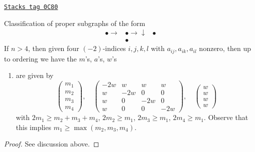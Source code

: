 \begin{lemma}[D4]
\label{models-lemma-D4}
\href{https://stacks.math.columbia.edu/tag/0C80}{\texttt{Stacks tag 0C80}}

Classification of proper subgraphs of the form
$$
\begin{array}{ccc}\bullet \longrightarrow & \bullet \longrightarrow\downarrow & \bullet \\  & \bullet & \end{array}
$$
If $n > 4$, then given four $(-2)$-indices $i, j, k, l$
with $a_{ij}, a_{ik}, a_{il}$ nonzero, then up
to ordering we have the $m$'s, $a$'s, $w$'s
\begin{enumerate}
\item
\label{models-item-D4}
are given by
$$
\left(
\begin{matrix}
m_1 \\
m_2 \\
m_3 \\
m_4
\end{matrix}
\right),
\quad
\left(
\begin{matrix}
-2w & w & w & w \\
w & -2w & 0 & 0 \\
w & 0 & -2w & 0 \\
w & 0 & 0 & -2w
\end{matrix}
\right),
\quad
\left(
\begin{matrix}
w \\
w \\
w \\
w
\end{matrix}
\right)
$$
with $2m_1 \geq m_2 + m_3 + m_4$, $2m_2 \geq m_1$, $2m_3 \geq m_1$,
$2m_4 \geq m_1$. Observe that this implies $m_1 \geq \max(m_2, m_3, m_4)$.
\end{enumerate}
\end{lemma}

\begin{proof}
See discussion above.
\end{proof}

